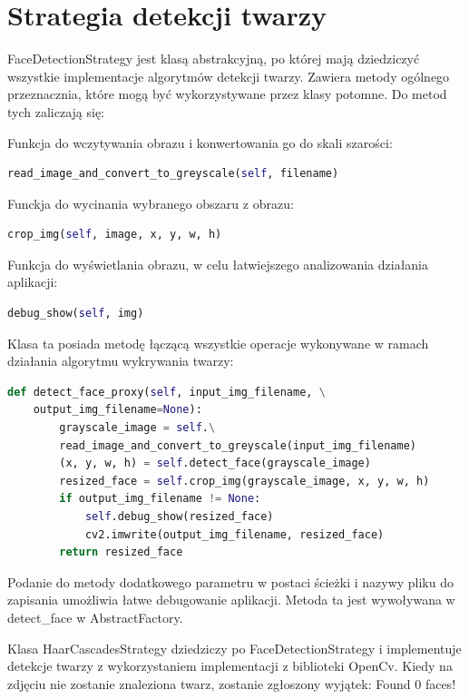 \documentclass[oneside, eng]{mgr}
\begin{document}
\section{Strategia detekcji twarzy}

FaceDetectionStrategy jest klasą abstrakcyjną, po której mają dziedziczyć wszystkie implementacje algorytmów detekcji twarzy. Zawiera metody ogólnego przeznacznia, które mogą być wykorzystywane przez klasy potomne. Do metod tych zaliczają się:

Funkcja do wczytywania obrazu i konwertowania go do skali szarości:

\begin{lstlisting}[language=Python]
	read_image_and_convert_to_greyscale(self, filename)
\end{lstlisting}

Funckja do wycinania wybranego obszaru z obrazu:

\begin{lstlisting}[language=Python]
	crop_img(self, image, x, y, w, h)
\end{lstlisting}

Funkcja do wyświetlania obrazu, w celu łatwiejszego analizowania działania aplikacji:

\begin{lstlisting}[language=Python]
	debug_show(self, img)
\end{lstlisting}

Klasa ta posiada metodę łączącą wszystkie operacje wykonywane w ramach działania algorytmu wykrywania twarzy:

\begin{lstlisting}[language=Python]
    def detect_face_proxy(self, input_img_filename, \
    output_img_filename=None):
        grayscale_image = self.\
        read_image_and_convert_to_greyscale(input_img_filename)
        (x, y, w, h) = self.detect_face(grayscale_image)
        resized_face = self.crop_img(grayscale_image, x, y, w, h)
        if output_img_filename != None:
        	self.debug_show(resized_face)
            cv2.imwrite(output_img_filename, resized_face)
        return resized_face
\end{lstlisting}

Podanie do metody dodatkowego parametru w postaci ścieżki i nazywy pliku do zapisania umożliwia łatwe debugowanie aplikacji. Metoda ta jest wywoływana w detect\_face w AbstractFactory.

Klasa HaarCascadesStrategy dziedziczy po FaceDetectionStrategy i implementuje detekcje twarzy z wykorzystaniem implementacji z biblioteki OpenCv. Kiedy na zdjęciu nie zostanie znaleziona twarz, zostanie zgłoszony wyjątek: Found 0 faces!
\end{document}
